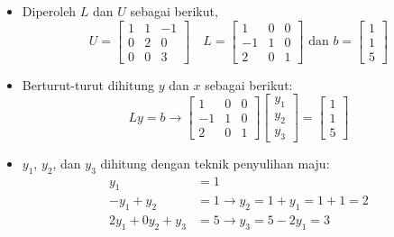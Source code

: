 \documentclass[pdflatex,compress,mathserif]{beamer}
\begin{document}
\begin{frame}
	\begin{itemize}
		\item Diperoleh $ L $ dan $ U $ sebagai berikut,
		\[U = \begin{bmatrix}
		1 & 1 & -1 \\ 0 & 2 & 0 \\ 0 & 0 & 3
		\end{bmatrix}\quad L = \begin{bmatrix}
		1 & 0 & 0 \\ -1 & 1 & 0 \\ 2 & 0 & 1
		\end{bmatrix} \text{ dan } b = \begin{bmatrix}
		1 \\ 1 \\ 5
		\end{bmatrix}\]
		\item Berturut-turut dihitung $ y $ dan $ x $ sebagai berikut:
		\[ Ly = b \rightarrow \begin{bmatrix}
		1 & 0 & 0 \\ -1 & 1 & 0 \\ 2 & 0 & 1
		\end{bmatrix} \begin{bmatrix}
		y_1 \\ y_2 \\ y_3
		\end{bmatrix} = \begin{bmatrix}
		1 \\ 1 \\ 5
		\end{bmatrix}\]
	\end{itemize}
\end{frame}

\begin{frame}
	\begin{itemize}
		\item $ y_1 $, $ y_2 $, dan $ y_3 $ dihitung dengan teknik penyulihan maju:
		\begin{align*}
			y_1 &= 1 \\
			-y_1 + y_2 &= 1 \rightarrow y_2 = 1 + y_1 = 1 + 1 = 2 \\
			2y_1 + 0y_2 + y_3 &= 5 \rightarrow y_3 = 5 - 2y_1 = 3
		\end{align*}
	\end{itemize}
\end{frame}
\end{document}
